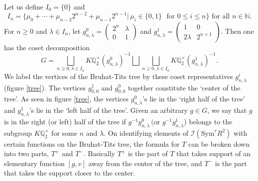 \documentclass[11pt, reqno]{amsart}
\numberwithin{equation}{section}
\newcommand\Q{\mathbb{Q}}
\newcommand\N{\mathbb{N}}
\newcommand\Sym{{\mathrm {Sym}}}
\theoremstyle{definition}
\theoremstyle{remark}
\theoremstyle{definition}
\theoremstyle{remark}
\theoremstyle{remark}
\begin{document}
Let us define $I_{0}=\{0\}$ and 
\begin{equation*}
I_{n}= \{\mu_{0}+\cdots+\mu_{n-2}2^{n-2}+ \mu_{n-1}2^{n-1}|\, \mu_{i} \in \{0,1\}\,\, \text{ for } 0\leq i\leq n\} \text{ for all } n\in \N.
\end{equation*}  For  $n\geq0$ and $\lambda \in I_{n}$, let $g_{n,\lambda}^{0} = \left(\begin{smallmatrix}
  2^{n} & \lambda\\
  0 & 1
\end{smallmatrix}\right)$ and $g_{n,\lambda}^{1} = \left(\begin{smallmatrix}
  1 & 0\\
  2\lambda & 2^{n+1}
\end{smallmatrix}\right).$
Then one has the coset decomposition 
$$ G = \bigsqcup_{n\geq 0,\lambda\in I_{n}}K\Q_{2}^{\times}(g_{n,\lambda}^{0})^{-1} \bigsqcup \bigsqcup_{n\geq 0,\lambda\in I_{n}}K\Q_{2}^{\times}(g_{n,\lambda}^{1})^{-1}.$$ We label the  vertices of the Bruhat-Tits tree by these coset representatives $g_{n,\lambda}^i$ (figure \ref{tree}).
 The vertices $g_{0,0}^{1}$ and $g_{0,0}^{0}$ together constitute the `center of the tree'. As seen in figure \ref{tree}, the vertices $g_{n,\lambda}^{0}$'s lie in the `right half of the tree' and $g_{n,\lambda}^{1}$'s lie in the `left half of the tree'. Given an arbitrary $g \in G$, we say that $g$ is in the right (or left) half of the tree  if $g^{-1}g_{n,\lambda}^{0}\, (\text{or } g^{-1}g_{n,\lambda}^{1}$) belongs to the subgroup $ K\Q_{2}^{\times}$ for some $n$ and $\lambda$.
On identifying elements of $\mathcal{I}(\Sym^rR^2)$ with certain functions on the Bruhat-Tits tree, the formula for $T$ can be broken down into two parts, $T^+$ and $T^-$. Basically $T^+$ is the part of $T$ that takes  support of an elementary function $[g,v]$ away from the center of the tree, and $T^-$ is the  part that takes the support closer to the center. 
\end{document}
